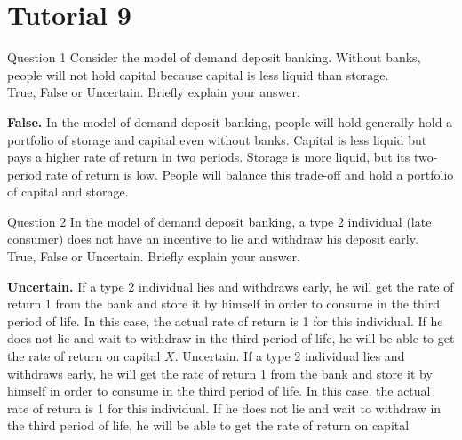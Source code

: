 \documentclass[a4paper]{article}
\newif\IfInSansMode
\numberwithin{equation}{section}
\numberwithin{figure}{section}
\begin{document}
\section{Tutorial 9}
	\begin{questionbox}{Question 1}
		Consider the model of demand deposit banking. Without banks, people will not hold capital because capital is less liquid than storage.\\
		True, False or Uncertain. Briefly explain your answer.
		\begin{explanationbox}
			\textbf{False.} In the model of demand deposit banking, people will hold generally hold a portfolio of storage and capital even without banks. Capital is less liquid but pays a higher rate of return in two periods. Storage is more liquid, but its two-period rate of return is low. People will balance this trade-off and hold a portfolio of capital and storage.
	\end{explanationbox}
	\end{questionbox}
	\begin{questionbox}{Question 2}
		In the model of demand deposit banking, a type 2 individual (late consumer) does not have an incentive to lie and withdraw his deposit early.\\
		True, False or Uncertain. Briefly explain your answer.
		\begin{explanationbox}
			\textbf{Uncertain.} If a type 2 individual lies and withdraws early, he will get the rate of return 1 from the bank and store it by himself in order to consume in the third period of life. In this case, the actual rate of return is 1 for this individual. If he does not lie and wait to withdraw in the third period of life, he will be able to get the rate of return on capital \( X \). Uncertain. If a type 2 individual lies and withdraws early, he will get the rate of return 1 from the bank and store it by himself in order to consume in the third period of life. In this case, the actual rate of return is 1 for this individual. If he does not lie and wait to withdraw in the third period of life, he will be able to get the rate of return on capital
		\end{explanationbox}
	\end{questionbox}
\end{document}
